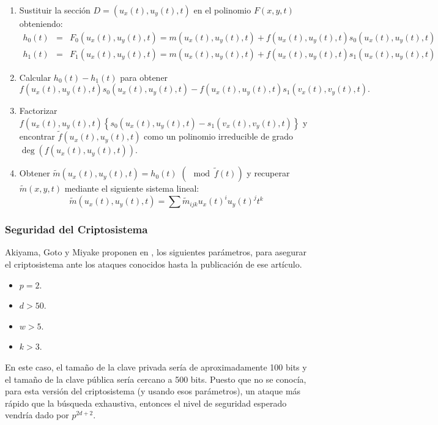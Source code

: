 \documentclass[11pt]{article}
\newcommand{\izq}{\left\{ }
\newcommand{\der}{\right\} }
\numberwithin{equation}{section} %
\numberwithin{figure}{section} %
\numberwithin{table}{section} %
\begin{document}
\begin{description}
\begin{enumerate}
							\item Sustituir la secci\'on $D=(u_x(t),u_y(t),t)$ en el polinomio $F(x,y,t)$ obteniendo:%
								\begin{eqnarray}
									h_0(t) &=& F_0(u_x(t),u_y(t),t) = m(u_x(t),u_y(t),t) + f(u_x(t),u_y(t),t) s_0(u_x(t),u_y(t),t) \nonumber\\
									h_1(t) &=& F_1(u_x(t),u_y(t),t) = m(u_x(t),u_y(t),t) + f(u_x(t),u_y(t),t) s_1(u_x(t),u_y(t),t) \nonumber
								\end{eqnarray}
							\item Calcular $h_0(t)-h_1(t)$ para obtener%
									$$
										f(u_x(t),u_y(t),t)s_0(u_x(t),u_y(t),t)-f(u_x(t),u_y(t),t)s_1(v_x(t),v_y(t),t).
									$$
							\item Factorizar $f(u_x(t),u_y(t),t)\izq s_0(u_x(t),u_y(t),t)-s_1(v_x(t),v_y(t),t)\der$ y encontrar $\tilde{f}(u_x(t),u_y(t),t)$ como un polinomio irreducible de grado $\deg(f(u_x(t),u_y(t),t))$.%
							\item Obtener $\tilde{m}(u_x(t),u_y(t),t)=h_0(t)$ $(\mod \tilde{f}(t))$ y recuperar $\tilde{m}(x,y,t)$ mediante el siguiente sistema lineal:%
									$$
										\tilde{m}(u_x(t),u_y(t),t)=\sum \tilde{m}_{ijk} u_x(t)^i u_y(t)^j t^k
									$$
						\end{enumerate}%
					\end{description}%


			\subsubsection{Seguridad del Criptosistema}
			\label{413Seg}

				Akiyama, Goto y Miyake proponen en \cite{AGM09}, los siguientes par\'ametros, para asegurar el criptosistema ante los ataques conocidos hasta la publicaci\'on de ese art\'iculo.
				\begin{itemize}
					\item $p=2$.
					\item $d>50$.
					\item $w>5$.
					\item $k>3$.
				\end{itemize}
				En este caso, el tamaño de la clave privada ser\'ia de aproximadamente 100 bits y el tamaño de la clave p\'ublica ser\'ia cercano a 500 bits. Puesto que no se conoc\'ia, para esta versi\'on del criptosistema (y usando esos par\'ametros), un ataque m\'as r\'apido que la b\'usqueda exhaustiva, entonces el nivel de seguridad esperado vendr\'ia dado por $p^{2d+2}$.
\end{document}
